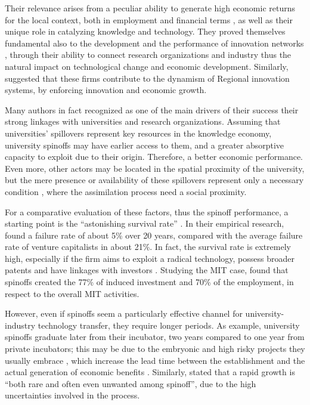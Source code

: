 Their relevance arises from a peculiar ability to generate high economic returns for the local context, both in employment and financial terms \citep{OShea2004}, as well as their unique role in catalyzing knowledge and technology. They proved themselves fundamental also to the development and the performance of innovation networks \citep{Perez2003}, through their ability to connect research organizations and industry \citep{Rizzo2015} thus the natural impact on technological change and economic development. Similarly, \citet{Perez2003} suggested that these firms contribute to the dynamism of Regional innovation systems, by enforcing innovation and economic growth.

Many authors in fact recognized as one of the main drivers of their success their strong linkages with universities and research organizations. Assuming that universities' spillovers represent key resources in the knowledge economy, university spinoffs may have earlier access to them, and a greater absorptive capacity to exploit due to their origin. Therefore, a better economic performance. Even more, other actors may be located in the spatial proximity of the university, but the mere presence or availability of these spillovers represent only a necessary condition \citep{Colombo2010}, where the assimilation process need a social proximity.

For a comparative evaluation of these factors, thus the spinoff performance, a starting point is the \enquote{astonishing survival rate} \citep{Balderi2007}. In their empirical research, \citet{Leitch2005} found a failure rate of about 5\% over 20 years, compared with the average failure rate of venture capitalists in about 21\%. In fact, the survival rate is extremely high, especially if the firm aims to exploit a radical technology, possess broader patents and have linkages with investors \citep{OShea2004}. Studying the MIT case, \citet{Rogers2001} found that spinoffs created the 77\% of induced investment and 70\% of the employment, in respect to the overall MIT activities.

However, even if spinoffs seem a particularly effective channel for university-industry technology transfer, they require longer periods. As example, university spinoffs graduate later from their incubator, two years compared to one year from private incubators; this may be due to the embryonic and high risky projects they usually embrace \citep{Rothaermel2005}, which increase the lead time between the establishment and the actual generation of economic benefits \citep{Leitch2005}. Similarly, \citet{Perez2003} stated that a rapid growth is \enquote{both rare and often even unwanted among spinoff}, due to the high uncertainties involved in the process.

